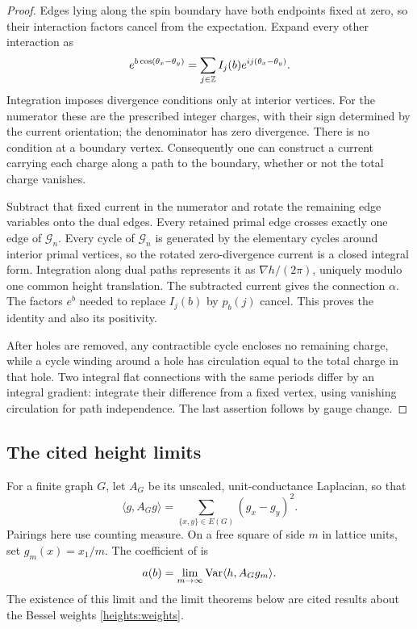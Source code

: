 \begin{proof}
Edges lying along the spin boundary have both endpoints fixed at zero,
so their interaction factors cancel from the expectation. Expand every
other interaction as
\[
 e^{b\cos(\theta_x-\theta_y)}
       =\sum_{j\in\mathbb Z}I_j(b)e^{ij(\theta_x-\theta_y)}.
\]
Integration imposes divergence conditions only at interior vertices.
For the numerator these are the prescribed integer charges, with their
sign determined by the current orientation; the denominator has zero
divergence. There is no condition at a boundary vertex. Consequently
one can construct a current carrying each charge along a path to the
boundary, whether or not the total charge vanishes.

Subtract that fixed current in the numerator and rotate the remaining
edge variables onto the dual edges. Every retained primal edge crosses
exactly one edge of \(\mathcal G_n\). Every cycle of \(\mathcal G_n\) is generated by the
elementary cycles around interior primal vertices, so the rotated
zero-divergence current is a closed integral form. Integration along
dual paths represents it as \(\nabla h/(2\pi)\), uniquely modulo one
common height translation. The subtracted current gives the connection
\(\alpha\). The factors \(e^b\) needed to replace \(I_j(b)\) by \(p_b(j)\)
cancel. This proves the identity and also its positivity.

After holes are removed, any contractible cycle encloses no remaining
charge, while a cycle winding around a hole has circulation equal to
the total charge in that hole. Two integral flat connections with the
same periods differ by an integral gradient: integrate their difference
from a fixed vertex, using vanishing circulation for path independence.
The last assertion follows by gauge change.
\end{proof}

\subsection{The cited height limits}

For a finite graph \(G\), let \(A_G\) be its unscaled, unit-conductance
Laplacian, so that
\[
 \langle g,A_Gg\rangle=\sum_{\{x,y\}\in E(G)}(g_x-g_y)^2.
\]
Pairings here use counting measure. On a free square of side \(m\) in
lattice units, set \(g_m(x)=x_1/m\). The coefficient of \cite{C} is
\[
       a(b)=\lim_{m\to\infty}
                 \operatorname{Var}\langle h,A_Gg_m\rangle.
\]
The existence of this limit and the limit theorems below are cited
results about the Bessel weights \eqref{heights:weights}.

